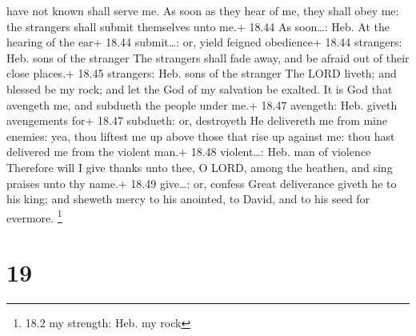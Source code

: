 have not known shall serve me.  As soon as they hear of me,
they shall obey me: the strangers shall submit themselves unto me.+
18.44 As soon\ldots: Heb. At the hearing of the ear+ 18.44 submit\ldots:
or, yield feigned obedience+ 18.44 strangers: Heb. sons of the stranger
 The strangers shall fade away, and be afraid out of their
close places.+ 18.45 strangers: Heb. sons of the stranger 
The LORD liveth; and blessed be my rock; and let the God of my salvation
be exalted.  It is God that avengeth me, and subdueth the
people under me.+ 18.47 avengeth: Heb. giveth avengements for+ 18.47
subdueth: or, destroyeth  He delivereth me from mine
enemies: yea, thou liftest me up above those that rise up against me:
thou hast delivered me from the violent man.+ 18.48 violent\ldots: Heb.
man of violence  Therefore will I give thanks unto thee, O
LORD, among the heathen, and sing praises unto thy name.+ 18.49
give\ldots: or, confess  Great deliverance giveth he to his
king; and sheweth mercy to his anointed, to David, and to his seed for
evermore. \footnote{18.2 my strength: Heb. my rock}

\hypertarget{section-18}{%
\section{19}\label{section-18}}

